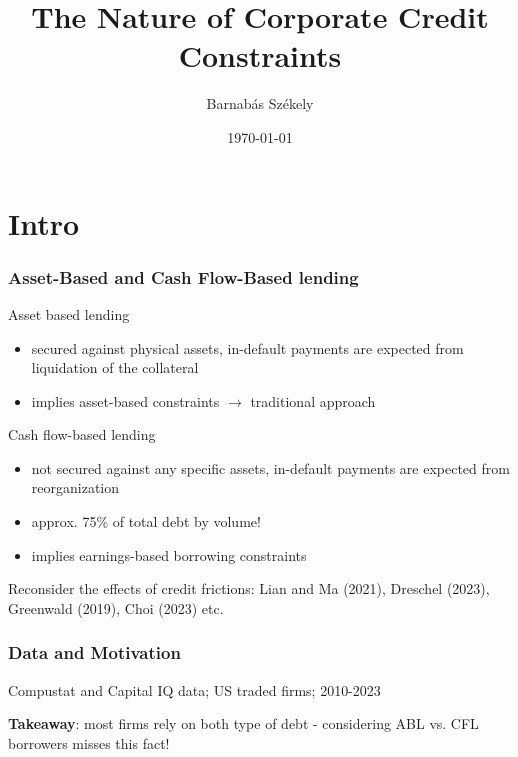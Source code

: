 \documentclass[notes]{beamer}
\title[]{The Nature of Corporate Credit Constraints} %
\author{Barnab\'as Sz\'ekely} %
\date{\today } %
\begin{document}
\renewcommand{\arraystretch}{1.4}

\begin{frame}
\titlepage %
\end{frame}


\section{Intro}

\begin{frame}[label=slide2]
\frametitle{Asset-Based and Cash Flow-Based lending}
Asset based lending 
\begin{itemize}
 \setlength\itemsep{0em}
    \item secured against physical assets, in-default payments are expected from liquidation of the collateral
    \item implies asset-based constraints $\rightarrow$ traditional approach
\end{itemize} 
Cash flow-based lending
\begin{itemize}
 \setlength\itemsep{0em}
    \item not secured against any specific assets, in-default payments are expected from reorganization 
    \item approx. 75\% of total debt by volume! 
    \item implies earnings-based borrowing constraints
\end{itemize} \vspace{3mm}
Reconsider the effects of credit frictions: Lian and Ma (2021), Dreschel (2023), Greenwald (2019), Choi (2023) etc.
\end{frame}

\begin{frame}[label=slide2]
\frametitle{Data and Motivation}
Compustat and Capital IQ data; US traded firms; 2010-2023
\begin{table}[h!]
\centering
{}
\label{tab:shares}
\end{table}
\textbf{Takeaway}: most firms rely on both type of debt - considering ABL vs. CFL borrowers misses this fact!

\end{frame}
\end{document}
